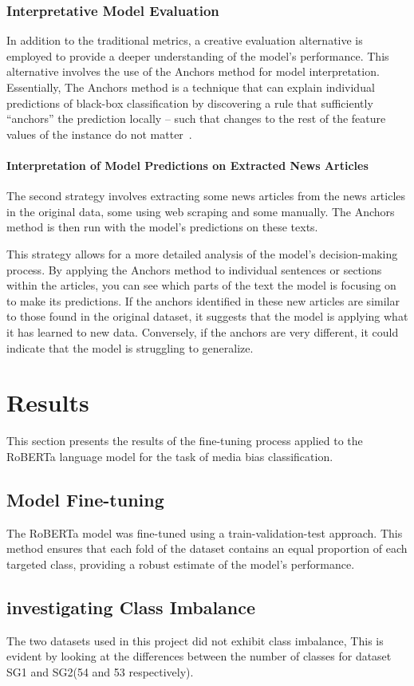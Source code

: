 \documentclass[11pt,a4paper]{article}
\begin{document}
\subsubsection{Interpretative Model Evaluation}
In addition to the traditional metrics, a creative evaluation alternative is employed to provide a deeper understanding of the model’s performance. This alternative involves the use of the Anchors method for model interpretation.
Essentially, The Anchors method is a technique that can explain individual predictions of black-box classification by discovering a rule that sufficiently “anchors” the prediction locally – such that changes to the rest of the feature values of the instance do not matter~\cite{ribeiro_2018_anchors}.

\paragraph{Interpretation of Model Predictions on Extracted News Articles}
The second strategy involves extracting some news articles from the news articles in the original data, some using web scraping and some manually. The Anchors method is then run with the model’s predictions on these texts. 

This strategy allows for a more detailed analysis of the model’s decision-making process. By applying the Anchors method to individual sentences or sections within the articles, you can see which parts of the text the model is focusing on to make its predictions.
If the anchors identified in these new articles are similar to those found in the original dataset, it suggests that the model is applying what it has learned to new data. Conversely, if the anchors are very different, it could indicate that the model is struggling to generalize.
\section{Results}
This section presents the results of the fine-tuning process applied to the RoBERTa language model for the task of media bias classification.
\subsection{Model Fine-tuning}
The RoBERTa model was fine-tuned using a train-validation-test approach. This method ensures that each fold of the dataset contains an equal proportion of each targeted class, providing a robust estimate of the model’s performance.
\subsection{investigating Class Imbalance}
The two datasets used in this project did not exhibit class imbalance, This is evident by looking at the differences between the number of classes for dataset SG1 and SG2(54 and 53 respectively).
\end{document}
